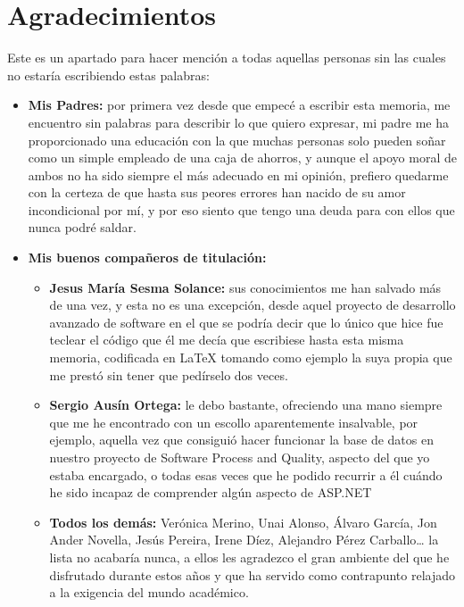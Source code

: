 \chapter*{Agradecimientos}

Este es un apartado para hacer mención a todas aquellas personas sin las cuales no estaría escribiendo estas palabras:

\begin{itemize}

\item \textbf{Mis Padres:} por primera vez desde que empecé a escribir esta memoria, me encuentro sin palabras para describir lo que quiero expresar, mi padre me ha proporcionado una educación con la que muchas personas solo pueden soñar como un simple empleado de una caja de ahorros, y aunque el apoyo moral de ambos no ha sido siempre el más adecuado en mi opinión, prefiero quedarme con la certeza de que hasta sus peores errores han nacido de su amor incondicional por mí, y por eso siento que tengo una deuda para con ellos que nunca podré saldar.

\item \textbf{Mis buenos compañeros de titulación:}
\begin{itemize}
\item \textbf{Jesus María Sesma Solance:} sus conocimientos me han salvado más de una vez, y esta no es una excepción, desde aquel proyecto de desarrollo avanzado de software en el que se podría decir que lo único que hice fue teclear el código que él me decía que escribiese hasta esta misma memoria, codificada en LaTeX tomando como ejemplo la suya propia que me prestó sin tener que pedírselo dos veces.
\item \textbf{Sergio Ausín Ortega:}  le debo bastante, ofreciendo una mano siempre que me he encontrado con un escollo aparentemente insalvable, por ejemplo, aquella vez que consiguió hacer funcionar la base de datos en nuestro proyecto de Software Process and Quality, aspecto del que yo estaba encargado, o todas esas veces que he podido recurrir a él cuándo he sido incapaz de comprender algún aspecto de ASP.NET
\item \textbf{Todos los demás:} Verónica Merino, Unai Alonso, Álvaro García, Jon Ander Novella, Jesús Pereira, Irene Díez, Alejandro Pérez Carballo… la lista no acabaría nunca, a ellos les agradezco el gran ambiente del que he disfrutado durante estos años y que ha servido como contrapunto relajado a la exigencia del mundo académico.
\end{itemize}


\end{itemize}
